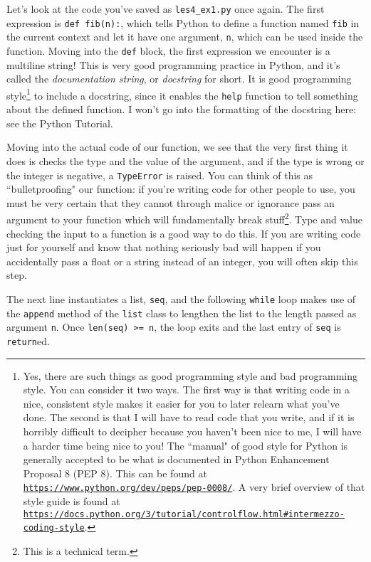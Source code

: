 \documentclass[m3380-lec-main.tex]{subfiles}
\begin{document}
Let's look at the code you've saved as \verb|les4_ex1.py| once again. The first expression is \verb|def fib(n):|, which tells Python to define a function named \verb|fib| in the current context and let it have one argument, \verb|n|, which can be used inside the function. Moving into the \verb|def| block, the first expression we encounter is a multiline string! This is very good programming practice in Python, and it's called the \emph{documentation string}, or \emph{docstring} for short. It is good programming style\footnote{Yes, there are such things as good programming style and bad programming style. You can consider it two ways. The first way is that writing code in a nice, consistent style makes it easier for you to later relearn what you've done. The second is that I will have to read code that you write, and if it is horribly difficult to decipher because you haven't been nice to me, I will have a harder time being nice to you! The ``manual" of good style for Python is generally accepted to be what is documented in Python Enhancement Proposal 8 (PEP 8). This can be found at \href{https://www.python.org/dev/peps/pep-0008/}{\texttt{https://www.python.org/dev/peps/pep-0008/}}. A very brief overview of that style guide is found at \href{https://docs.python.org/3/tutorial/controlflow.html\#intermezzo-coding-style}{\texttt{https://docs.python.org/3/tutorial/controlflow.html\#intermezzo-coding-style}}.} to include a docstring, since it enables the \verb|help| function to tell something about the defined function. I won't go into the formatting of the docstring here: see the Python Tutorial.

Moving into the actual code of our function, we see that the very first thing it does is checks the type and the value of the argument, and if the type is wrong or the integer is negative, a \verb|TypeError| is raised. You can think of this as ``bulletproofing" our function: if you're writing code for other people to use, you must be very certain that they cannot through malice or ignorance pass an argument to your function which will fundamentally break stuff\footnote{This is a technical term.}. Type and value checking the input to a function is a good way to do this. If you are writing code just for yourself and know that nothing seriously bad will happen if you accidentally pass a float or a string instead of an integer, you will often skip this step.

The next line instantiates a list, \verb|seq|, and the following \verb|while| loop makes use of the \verb|append| method of the \verb|list| class to lengthen the list to the length passed as argument \verb|n|. Once \verb|len(seq) >= n|, the loop exits and the last entry of \verb|seq| is \verb|return|ed.
\end{document}
